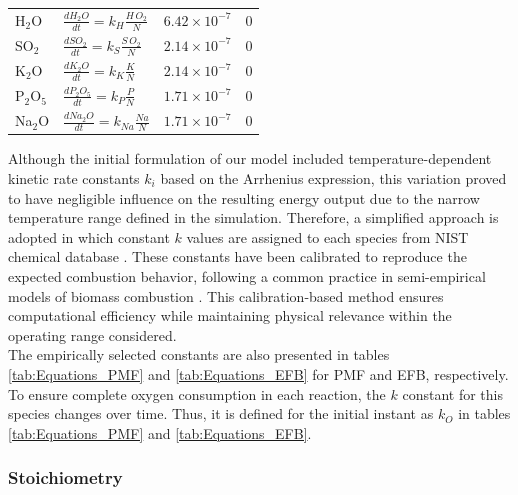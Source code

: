 \documentclass[preprint,12pt]{elsarticle}
\begin{document}
\begin{table}[H]
\begin{tabularx}{\textwidth}{l >{\centering\arraybackslash}X c c}
H$_2$O &
$\displaystyle \frac{dH_2O}{dt} = k_H \frac{H\,O_2}{N}$ &
$6.42 \times 10^{-7}$ & 
0 \\[4pt]

SO$_2$ &
$\displaystyle \frac{dSO_2}{dt} = k_S \frac{S\,O_2}{N}$ &
$2.14 \times 10^{-7}$ & 
0 \\[4pt]

K$_2$O & 
$\displaystyle \frac{dK_2O}{dt} = k_K \frac{K}{N}$ &
$2.14 \times 10^{-7}$ & 
0 \\[4pt]

P$_2$O$_5$ & 
$\displaystyle \frac{dP_2O_5}{dt} = k_P \frac{P}{N}$ &
$1.71 \times 10^{-7}$ & 
0 \\[4pt]

Na$_2$O & 
$\displaystyle \frac{dNa_2O}{dt} = k_{Na} \frac{Na}{N}$ &
$1.71 \times 10^{-7}$ & 
0 \\[6pt]
\hline
\end{tabularx}
\end{table}


Although the initial formulation of our model included temperature-dependent kinetic rate constants $k_i$ based on the Arrhenius expression, this variation proved to have negligible influence on the resulting energy output due to the narrow temperature range defined in the simulation. Therefore, a simplified approach is adopted in which constant $k$ values are assigned to each species from NIST chemical database \cite{NISTkinetics}. These constants have been calibrated to reproduce the expected combustion behavior, following a common practice in semi-empirical models of biomass combustion \cite{GarciaNunez2006}. This calibration-based method ensures computational efficiency while maintaining physical relevance within the operating range considered. \\

The empirically selected constants are also presented in tables \ref{tab:Equations_PMF} and \ref{tab:Equations_EFB} for PMF and EFB, respectively. To ensure complete oxygen consumption in each reaction, the $k$ constant for this species changes over time. Thus, it is defined for the initial instant as $k_O$ in tables \ref{tab:Equations_PMF} and \ref{tab:Equations_EFB}.  \\ 



\subsubsection{Stoichiometry}
\label{Calculus of the required Oxygen for combustion}\\
\end{document}
